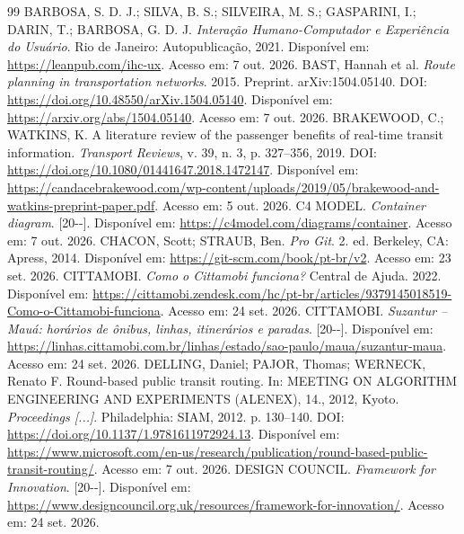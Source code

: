 \documentclass[12pt,oneside,a4paper,brazil,chapter=TITLE]{abntex2}
\begin{document}
\postextual
\begin{thebibliography}{99}
\SingleSpacing
{}
 BARBOSA, S. D. J.; SILVA, B. S.; SILVEIRA, M. S.; GASPARINI, I.; DARIN, T.; BARBOSA, G. D. J. \textit{Interação Humano-Computador e Experiência do Usuário}. Rio de Janeiro: Autopublicação, 2021. Disponível em: \url{https://leanpub.com/ihc-ux}. Acesso em: 7 out. 2026.
 BAST, Hannah et al. \textit{Route planning in transportation networks}. 2015. Preprint. arXiv:1504.05140. DOI: \url{https://doi.org/10.48550/arXiv.1504.05140}. Disponível em: \url{https://arxiv.org/abs/1504.05140}. Acesso em: 7 out. 2026.
 BRAKEWOOD, C.; WATKINS, K. A literature review of the passenger benefits of real-time transit information. \textit{Transport Reviews}, v. 39, n. 3, p. 327--356, 2019. DOI: \url{https://doi.org/10.1080/01441647.2018.1472147}. Disponível em: \url{https://candacebrakewood.com/wp-content/uploads/2019/05/brakewood-and-watkins-preprint-paper.pdf}. Acesso em: 5 out. 2026.
 C4 MODEL. \textit{Container diagram}. [20\mbox{-}\mbox{-}]. Disponível em: \url{https://c4model.com/diagrams/container}. Acesso em: 7 out. 2026.
 CHACON, Scott; STRAUB, Ben. \textit{Pro Git}. 2. ed. Berkeley, CA: Apress, 2014. Disponível em: \url{https://git-scm.com/book/pt-br/v2}. Acesso em: 23 set. 2026.
 CITTAMOBI. \textit{Como o Cittamobi funciona?} Central de Ajuda. 2022. Disponível em: \url{https://cittamobi.zendesk.com/hc/pt-br/articles/9379145018519-Como-o-Cittamobi-funciona}. Acesso em: 24 set. 2026.
 CITTAMOBI. \textit{Suzantur -- Mauá: horários de ônibus, linhas, itinerários e paradas}. [20\mbox{-}\mbox{-}]. Disponível em: \url{https://linhas.cittamobi.com.br/linhas/estado/sao-paulo/maua/suzantur-maua}. Acesso em: 24 set. 2026.
 DELLING, Daniel; PAJOR, Thomas; WERNECK, Renato F. Round-based public transit routing. In: MEETING ON ALGORITHM ENGINEERING AND EXPERIMENTS (ALENEX), 14., 2012, Kyoto. \textit{Proceedings [...]}. Philadelphia: SIAM, 2012. p. 130--140. DOI: \url{https://doi.org/10.1137/1.9781611972924.13}. Disponível em: \url{https://www.microsoft.com/en-us/research/publication/round-based-public-transit-routing/}. Acesso em: 7 out. 2026.
 DESIGN COUNCIL. \textit{Framework for Innovation}. [20\mbox{-}\mbox{-}]. Disponível em: \url{https://www.designcouncil.org.uk/resources/framework-for-innovation/}. Acesso em: 24 set. 2026.

\end{thebibliography}
\end{document}
